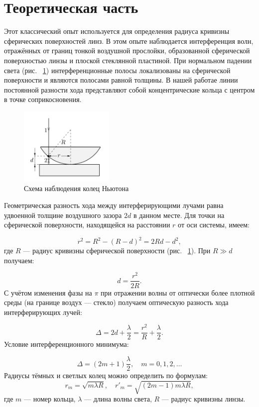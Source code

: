 \documentclass[a4paper, 12pt]{article}
\begin{document}
\section*{Теоретическая часть}

\quad Этот классический опыт используется для определения радиуса кривизны сферических поверхностей линз. В этом опыте наблюдается интерференция волн, отражённых от границ тонкой воздушной прослойки, образованной сферической поверхностью линзы и плоской стеклянной пластиной. При нормальном падении света (рис. ~\ref{fig:newton}) интерференционные полосы локализованы на сферической поверхности и являются полосами равной толщины.  В нашей работае линии постоянной разности хода представляют собой концентрические кольца с центром в точке соприкосновения.

\begin{figure}[h!]
    \centering
    \includegraphics[width=0.4\textwidth]{newton.png}
    \caption{Схема наблюдения колец Ньютона}
    \label{fig:newton}
\end{figure}

Геометрическая разность хода между интерферирующими лучами равна удвоенной толщине воздушного зазора \( 2d \) в данном месте. Для точки на сферической поверхности, находящейся на расстоянии \( r \) от оси системы, имеем:

\[
r^2 = R^2 - (R - d)^2 = 2Rd - d^2,
\]
где \( R \) — радиус кривизны сферической поверхности (рис. ~\ref{fig:newton}).
При \( R \gg d \) получаем:

\[
d = \frac{r^2}{2R}.
\]
С учётом изменения фазы на \( \pi \) при отражении волны от оптически более плотной среды (на границе воздух — стекло) получаем оптическую разность хода интерферирующих лучей:

\[
\Delta = 2d + \frac{\lambda}{2} = \frac{r^2}{R} + \frac{\lambda}{2}.
\]
Условие интерференционного минимума:

\[
\Delta = (2m + 1)\frac{\lambda}{2}, \quad m = 0, 1, 2, \ldots
\]
Радиусы тёмных и светлых колец можно определить по формулам:
\[
r_m = \sqrt{m \lambda R}, \quad r'_m = \sqrt{(2m-1)m \lambda R},
\]
где \( m \) — номер кольца, \( \lambda \) — длина волны света, \( R \) — радиус кривизны линзы.
\end{document}
